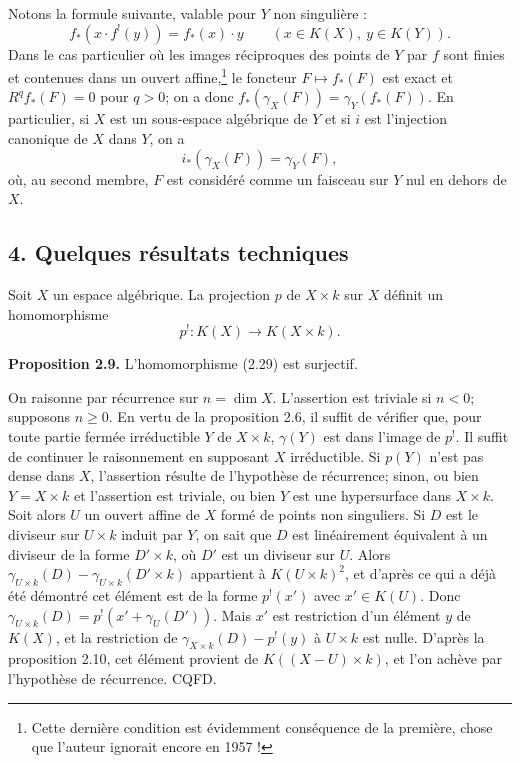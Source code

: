 \documentclass[11pt]{article}
\begin{document}
Notons la formule suivante, valable pour $Y$ non singulière :
\begin{equation}\tag{2.27}
 f_*(x\cdot f^!(y))=f_*(x)\cdot y\qquad(x\in K(X),\ y\in K(Y)).
\end{equation}
Dans le cas particulier où les images réciproques des points de $Y$ par $f$ sont finies et contenues dans un ouvert affine,\footnote{Cette dernière condition est évidemment conséquence de la première, chose que l'auteur ignorait encore en 1957 !} le foncteur $F\mapsto f_*(F)$ est exact et $R^qf_*(F)=0$ pour $q>0$; on a donc $f_*(\gamma_X(F))=\gamma_Y(f_*(F))$. En particulier, si $X$ est un sous-espace algébrique de $Y$ et si $i$ est l'injection canonique de $X$ dans $Y$, on a
\begin{equation}\tag{2.28}
 i_*(\gamma_X(F))=\gamma_Y(F),
\end{equation}
où, au second membre, $F$ est considéré comme un faisceau sur $Y$ nul en dehors de $X$.

\subsection*{4. Quelques résultats techniques}

Soit $X$ un espace algébrique. La projection $p$ de $X\times k$ sur $X$ définit un homomorphisme
\begin{equation}\tag{2.29}
 p^!:K(X)\longrightarrow K(X\times k).
\end{equation}

\textbf{Proposition 2.9.} L'homomorphisme (2.29) est surjectif.

On raisonne par récurrence sur $n=\dim X$. L'assertion est triviale si $n<0$; supposons $n\geq0$. En vertu de la proposition 2.6, il suffit de vérifier que, pour toute partie fermée irréductible $Y$ de $X\times k$, $\gamma(Y)$ est dans l'image de $p^!$. Il suffit de continuer le raisonnement en supposant $X$ irréductible. Si $p(Y)$ n'est pas dense dans $X$, l'assertion résulte de l'hypothèse de récurrence; sinon, ou bien $Y=X\times k$ et l'assertion est triviale, ou bien $Y$ est une hypersurface dans $X\times k$. Soit alors $U$ un ouvert affine de $X$ formé de points non singuliers. Si $D$ est le diviseur sur $U\times k$ induit par $Y$, on sait que $D$ est linéairement équivalent à un diviseur de la forme $D'\times k$, où $D'$ est un diviseur sur $U$. Alors $\gamma_{U\times k}(D)-\gamma_{U\times k}(D'\times k)$ appartient à $K(U\times k)^2$, et d'après ce qui a déjà été démontré cet élément est de la forme $p^!(x')$ avec $x'\in K(U)$. Donc $\gamma_{U\times k}(D)=p^!(x'+\gamma_U(D'))$. Mais $x'$ est restriction d'un élément $y$ de $K(X)$, et la restriction de $\gamma_{X\times k}(D)-p^!(y)$ à $U\times k$ est nulle. D'après la proposition 2.10, cet élément provient de $K((X-U)\times k)$, et l'on achève par l'hypothèse de récurrence. CQFD.
\end{document}
